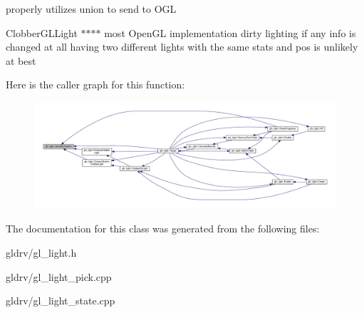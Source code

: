 properly utilizes union to send to O\+GL 

Clobber\+G\+L\+Light $\ast$$\ast$$\ast$$\ast$ most Open\+GL implementation dirty lighting if any info is changed at all having two different lights with the same stats and pos is unlikely at best 

Here is the caller graph for this function\+:
\nopagebreak
\begin{figure}[H]
\begin{center}
\leavevmode
\includegraphics[width=350pt]{d9/dcc/classgfx__light_abb55026e68c8f5b8292d6d9915061913_icgraph}
\end{center}
\end{figure}




The documentation for this class was generated from the following files\+:\begin{DoxyCompactItemize}
\item 
gldrv/gl\+\_\+light.\+h\item 
gldrv/gl\+\_\+light\+\_\+pick.\+cpp\item 
gldrv/gl\+\_\+light\+\_\+state.\+cpp\end{DoxyCompactItemize}
